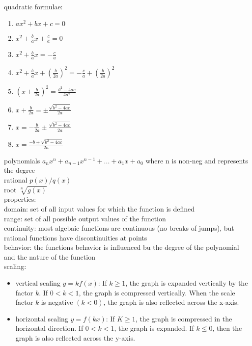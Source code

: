 \documentclass{article}
\begin{document}
quadratic formulae:

	\begin{enumerate}
		\item $ax^2 + bx + c = 0$
		\item $x^2 + \frac{b}{a}x + \frac{c}{a} = 0$
		\item $x^2 + \frac{b}{a}x = -\frac{c}{a}$
		\item $x^2 + \frac{b}{a}x + \left( \frac{b}{2a} \right)^2 = -\frac{c}{a} + \left( \frac{b}{2a} \right)^2$
		\item $\left( x + \frac{b}{2a} \right)^2 = \frac{b^2 - 4ac}{4a^2}$
		\item $x + \frac{b}{2a} = \pm \frac{\sqrt{b^2 - 4ac}}{2a}$
		\item $x = -\frac{b}{2a} \pm \frac{\sqrt{b^2 - 4ac}}{2a}$
		\item $x = \frac{-b \pm \sqrt{b^2 - 4ac}}{2a}$
	\end{enumerate}

polynomials $a_nx^n + a_{n-1}x^{n-1} + ... + a_1x + a_0$ where n is non-neg and represents the degree\\

rational $p(x)/q(x)$\\

root $\sqrt[n]{g(x)}$\\

properties:\\
	domain: set of all input values for which the function is defined\\
	range: set of all possible output values of the function\\
	
	continuity: most algebaic functions are continuous (no breaks of jumps), but rational functions have discontinuities at points\\
		
	behavior: the functions behavior is influenced bu the degree of the polynomial and the nature of the function\\


	scaling:
		\begin{itemize}
			\item{vertical scaling} $y = kf(x)$: If $k \geq 1$, the graph is expanded vertically by the factor $k$. If $0 < k < 1$, the graph is compressed vertically. When the scale factor $k$ is negative $(k < 0)$, the graph is also reflected across the x-axis.
			\item{horizontal scaling} $y = f(kx)$: If $K \geq 1$, the graph is compressed in the horizontal direction. If $0 < k < 1$, the graph is expanded. If $k \leq 0$, then the graph is also reflected across the y-axis.
		\end{itemize}
\end{document}
